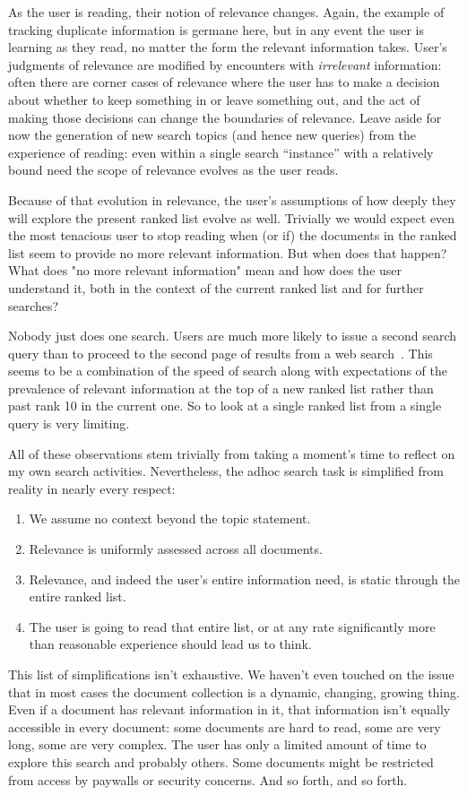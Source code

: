 \documentclass[nobib]{tufte-book}
\begin{document}
As the user is reading, their notion of relevance changes.  Again, the example of tracking duplicate information is germane here, but in any event the user is learning as they read, no matter the form the relevant information takes.  User's judgments of relevance are modified by encounters with {\em irrelevant} information: often there are corner cases of relevance where the user has to make a decision about whether to keep something in or leave something out, and the act of making those decisions can change the boundaries of relevance.  Leave aside for now the generation of new search topics (and hence new queries) from the experience of reading: even within a single search ``instance'' with a relatively bound need the scope of relevance evolves as the user reads.

Because of that evolution in relevance, the user's assumptions of how deeply they will explore the present ranked list evolve as well.  Trivially we would expect even the most tenacious user to stop reading when (or if) the documents in the ranked list seem to provide no more relevant information.  But when does that happen?  What does "no more relevant information" mean and how does the user understand it, both in the context of the current ranked list and for further searches?

Nobody just does one search.  Users are much more likely to issue a second search query than to proceed to the second page of results from a web search~\autocite{ref-missing}.  This seems to be a combination of the speed of search along with expectations of the prevalence of relevant information at the top of a new ranked list rather than past rank 10 in the current one.  So to look at a single ranked list from a single query is very limiting.

All of these observations stem trivially from taking a moment's time to reflect on my own search activities.  Nevertheless, the adhoc search task is simplified from reality in nearly every respect:
\begin{enumerate}
    \item We assume no context beyond the topic statement.
    \item Relevance is uniformly assessed across all documents.
    \item Relevance, and indeed the user's entire information need, is static through the entire ranked list.
    \item The user is going to read that entire list, or at any rate significantly more than reasonable experience should lead us to think.
\end{enumerate}
This list of simplifications isn't exhaustive.  We haven't even touched on the issue that in most cases the document collection is a dynamic, changing, growing thing.  Even if a document has relevant information in it, that information isn't equally accessible in every document: some documents are hard to read, some are very long, some are very complex.  The user has only a limited amount of time to explore this search and probably others.  Some documents might be restricted from access by paywalls or security concerns.  And so forth, and so forth.
\end{document}
